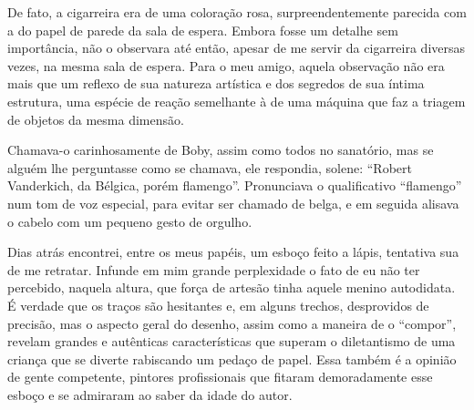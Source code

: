 
De fato, a cigarreira era de uma coloração rosa, surpreendentemente
parecida com a do papel de parede da sala de espera. Embora fosse um
detalhe sem importância, não o observara até então, apesar de me servir
da cigarreira diversas vezes, na mesma sala de espera. Para o meu amigo,
aquela observação não era mais que um reflexo de sua natureza artística
e dos segredos de sua íntima estrutura, uma espécie de reação semelhante
à de uma máquina que faz a triagem de objetos da mesma dimensão.

Chamava-o carinhosamente de Boby, assim como todos no sanatório, mas se
alguém lhe perguntasse como se chamava, ele respondia, solene: ``Robert
Vanderkich, da Bélgica, porém flamengo''. Pronunciava o qualificativo
``flamengo'' num tom de voz especial, para evitar ser chamado de belga,
e em seguida alisava o cabelo com um pequeno gesto de orgulho.

Dias atrás encontrei, entre os meus papéis, um esboço feito a lápis,
tentativa sua de me retratar. Infunde em mim grande perplexidade o fato
de eu não ter percebido, naquela altura, que força de artesão tinha
aquele menino autodidata. É verdade que os traços são hesitantes e, em
alguns trechos, desprovidos de precisão, mas o aspecto geral do desenho,
assim como a maneira de o ``compor'', revelam grandes e autênticas
características que superam o diletantismo de uma criança que se
diverte rabiscando um pedaço de papel. Essa também é a opinião de gente
competente, pintores profissionais que fitaram demoradamente esse esboço
e se admiraram ao saber da idade do autor.


